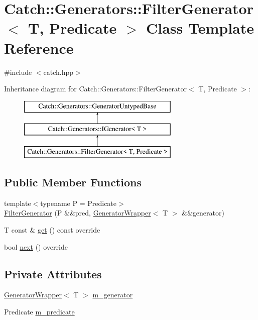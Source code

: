 \hypertarget{class_catch_1_1_generators_1_1_filter_generator}{}\section{Catch\+::Generators\+::Filter\+Generator$<$ T, Predicate $>$ Class Template Reference}
\label{class_catch_1_1_generators_1_1_filter_generator}


{\ttfamily \#include $<$catch.\+hpp$>$}

Inheritance diagram for Catch\+::Generators\+::Filter\+Generator$<$ T, Predicate $>$\+:\begin{figure}[H]
\begin{center}
\leavevmode
\includegraphics[height=3.000000cm]{class_catch_1_1_generators_1_1_filter_generator}
\end{center}
\end{figure}
\subsection*{Public Member Functions}
\begin{DoxyCompactItemize}
\item 
{\footnotesize template$<$typename P  = Predicate$>$ }\\\mbox{\hyperlink{class_catch_1_1_generators_1_1_filter_generator_aa16886a5e41cbd3b6ffa3dd52388a3a1}{Filter\+Generator}} (P \&\&pred, \mbox{\hyperlink{class_catch_1_1_generators_1_1_generator_wrapper}{Generator\+Wrapper}}$<$ T $>$ \&\&generator)
\item 
T const  \& \mbox{\hyperlink{class_catch_1_1_generators_1_1_filter_generator_ab30e81b61a77430661d40f814758f6fe}{get}} () const override
\item 
bool \mbox{\hyperlink{class_catch_1_1_generators_1_1_filter_generator_a02ce0839dcaa7545c55d0fe70cc50e84}{next}} () override
\end{DoxyCompactItemize}
\subsection*{Private Attributes}
\begin{DoxyCompactItemize}
\item 
\mbox{\hyperlink{class_catch_1_1_generators_1_1_generator_wrapper}{Generator\+Wrapper}}$<$ T $>$ \mbox{\hyperlink{class_catch_1_1_generators_1_1_filter_generator_a6fb6975b1401cf7bd7e76e3a542a45cf}{m\+\_\+generator}}
\item 
Predicate \mbox{\hyperlink{class_catch_1_1_generators_1_1_filter_generator_a51cda8aafad62eba1d26618f3ca8cff1}{m\+\_\+predicate}}
\end{DoxyCompactItemize}

